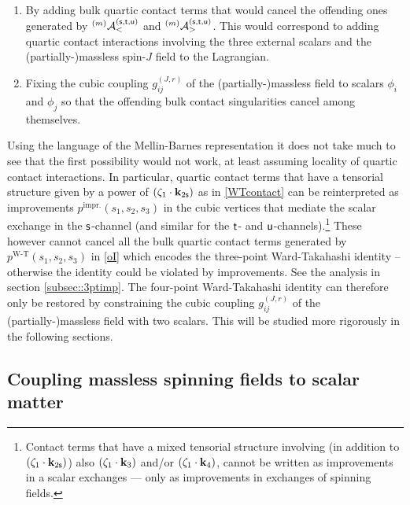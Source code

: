 \documentclass[11pt,a4paper]{article}
\begin{document}
\begin{enumerate}
    \item By adding bulk quartic contact terms that would cancel the offending ones generated by ${}^{\left(m\right)}{\cal A}^{\left({\sf s}, {\sf t}, {\sf u}\right)}_{<}$ and ${}^{\left(m\right)}{\cal A}^{\left({\sf s}, {\sf t}, {\sf u}\right)}_{>}$. This would correspond to adding quartic contact interactions involving the three external scalars and the (partially-)massless spin-$J$ field to the Lagrangian.
    \item Fixing the cubic coupling $g^{\left(J,r\right)}_{ij}$ of the (partially-)massless field to scalars $\phi_i$ and $\phi_j$ so that the offending bulk contact singularities cancel among themselves.
\end{enumerate}
Using the language of the Mellin-Barnes representation it does not take much to see that the first possibility would not work, at least assuming locality of quartic contact interactions. In particular,
quartic contact terms that have a tensorial structure given by a power of $\left(\zeta_1 \cdot {\bf k}_{2{\sf s}}\right)$ as in \eqref{WTcontact} can be reinterpreted as improvements $p^{\text{impr.}}\left(s_1,s_2,s_3\right)$ in the cubic vertices that mediate the scalar exchange in the ${\sf s}$-channel (and similar for the ${\sf t}$- and ${\sf u}$-channels).\footnote{Contact terms that have a mixed tensorial structure involving (in addition to $\left(\zeta_1 \cdot {\bf k}_{2{\sf s}}\right)$) also $\left(\zeta_1 \cdot {\bf k}_{3}\right)$ and/or $\left(\zeta_1 \cdot {\bf k}_{4}\right)$, cannot be written as improvements in a scalar exchanges --- only as improvements in exchanges of spinning fields.} These however cannot cancel all the bulk quartic contact terms generated by $p^{\text{W-T}}\left(s_1,s_2,s_3\right)$ in \eqref{oI} which encodes the three-point Ward-Takahashi identity -- otherwise the identity could be violated by improvements. See the analysis in section \ref{subsec::3ptimp}. The four-point Ward-Takahashi identity can therefore only be restored by constraining the cubic coupling $g^{\left(J,r\right)}_{ij}$ of the (partially-)massless field with two scalars. This will be studied more rigorously in the following sections. 

\subsection{Coupling massless spinning fields to scalar matter}
\label{subsecc::genml4pt}
\end{document}
